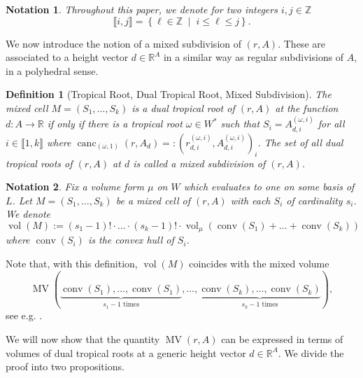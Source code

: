 \documentclass[a4paper]{article}
\newtheorem{definition}{Definition}
\newtheorem{notation}{Notation}
\theoremstyle{remark}
\newcommand{\setdes}[2]{\left\{#1\;\middle|\;#2\right\}}
\def\RR{\mathbb{R}}
\def\ZZ{\mathbb{Z}}
\newcommand{\irng}[1]{\llbracket #1 \rrbracket}
\DeclareMathOperator{\mv}{MV}
\DeclareMathOperator{\vol}{vol}
\DeclareMathOperator{\canc}{canc}
\begin{document}
\begin{notation}
  Throughout this paper, we denote for two integers $i,j\in \ZZ$
  \[\irng{i,j} = \setdes{\ell \in \ZZ}{i\leq \ell \leq j}.\]
\end{notation}

We now introduce the notion of a mixed subdivision of $(r, A)$. These
are associated to a height vector $d\in \RR^A$ in a similar way as regular
subdivisions of $A$, in a polyhedral sense.

\begin{definition}[Tropical Root, Dual Tropical Root, Mixed Subdivision]
  \label{def:tropicalroot}
  The mixed cell $M = (S_1,\hdots,S_k)$ is a {\em dual tropical root}
  of $(r,A)$ at the function $d:A\rightarrow \RR$ if only if there is a {\em
    tropical root} $\omega\in W^{*}$ such that
  $S_i=A_{d,i}^{(\omega,i)}$ for all $i\in \irng{1,k}$ where
  $\canc_{(\omega,1)}(r,A_d) =: (r_{d,i}^{(\omega,i)},A_{d,i}^{(\omega,i)})_i$.  The set
  of all dual tropical roots of $(r,A)$ at $d$ is called a {\em mixed
    subdivision} of $(r,A)$.
\end{definition}

\begin{notation}
  \label{not:volume}
  Fix a volume form $\mu$ on $W$ which evaluates to one on some basis of
  $L$. Let $M = (S_1,\hdots,S_k)$ be a mixed cell of $(r,A)$ with each
  $S_i$ of cardinality $s_i$. We denote
\[\vol(M):= (s_1-1)!\cdot\hdots \cdot (s_{k}-1)!\cdot \vol_{\mu}\left(\operatorname{conv}(S_1)+\hdots + \operatorname{conv}(S_k)\right)\]
where $\operatorname{conv}(S_i)$ is the convex hull of $S_i$.
\end{notation}

Note that, with this definition, $\vol(M)$ coincides with the mixed
volume
\[\mv(\underbrace{\operatorname{conv}(S_1),\hdots,\operatorname{conv}(S_1)}_{\text{$s_1-1$ times}},\hdots,\underbrace{\operatorname{conv}(S_k),\hdots,\operatorname{conv}(S_k)}_{\text{$s_k-1$ times}}),\]
see e.g. \cite{huber1995}.

We will now show that the
quantity $\mv(r,A)$ can be expressed in terms of volumes of dual
tropical roots at a generic height vector $d\in \RR^A$. We divide the
proof into two propositions.
\end{document}
